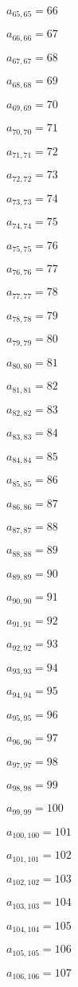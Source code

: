 \documentclass[a4paper,12pt]{article}
\begin{document}
$a _{ 65, 65 } = 66$

$a _{ 66, 66 } = 67$

$a _{ 67, 67 } = 68$

$a _{ 68, 68 } = 69$

$a _{ 69, 69 } = 70$

$a _{ 70, 70 } = 71$

$a _{ 71, 71 } = 72$

$a _{ 72, 72 } = 73$

$a _{ 73, 73 } = 74$

$a _{ 74, 74 } = 75$

$a _{ 75, 75 } = 76$

$a _{ 76, 76 } = 77$

$a _{ 77, 77 } = 78$

$a _{ 78, 78 } = 79$

$a _{ 79, 79 } = 80$

$a _{ 80, 80 } = 81$

$a _{ 81, 81 } = 82$

$a _{ 82, 82 } = 83$

$a _{ 83, 83 } = 84$

$a _{ 84, 84 } = 85$

$a _{ 85, 85 } = 86$

$a _{ 86, 86 } = 87$

$a _{ 87, 87 } = 88$

$a _{ 88, 88 } = 89$

$a _{ 89, 89 } = 90$

$a _{ 90, 90 } = 91$

$a _{ 91, 91 } = 92$

$a _{ 92, 92 } = 93$

$a _{ 93, 93 } = 94$

$a _{ 94, 94 } = 95$

$a _{ 95, 95 } = 96$

$a _{ 96, 96 } = 97$

$a _{ 97, 97 } = 98$

$a _{ 98, 98 } = 99$

$a _{ 99, 99 } = 100$

$a _{ 100, 100 } = 101$

$a _{ 101, 101 } = 102$

$a _{ 102, 102 } = 103$

$a _{ 103, 103 } = 104$

$a _{ 104, 104 } = 105$

$a _{ 105, 105 } = 106$

$a _{ 106, 106 } = 107$
\end{document}
